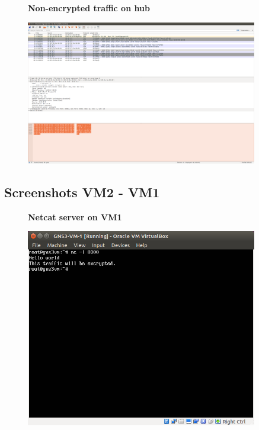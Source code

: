 \documentclass[a4paper]{scrreprt}
\begin{document}
\begin{figure}[H]
    \centering
    \textbf{Non-encrypted traffic on hub}\par\medskip
    \includegraphics[width=0.9\textwidth]{resources/wireshark_hub2_to_r2.png}
\end{figure}

\subsection{Screenshots VM2 - VM1}

\begin{figure}[H]
    \centering
    \textbf{Netcat server on VM1}\par\medskip
    \includegraphics[width=0.9\textwidth]{resources/nc_vm1.png}
\end{figure}
\end{document}
